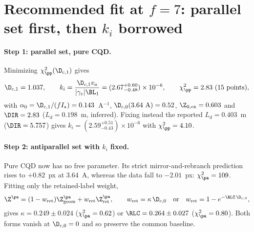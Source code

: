 \section{Recommended fit at \texorpdfstring{$f=7$}{f=7}: parallel set first, then \texorpdfstring{$k_i$}{ki} borrowed}
\label{sec:recommended}

\paragraph{Step 1: parallel set, pure CQD.} Minimizing $\chi^2_\pp(\D_{c,1})$ gives
\begin{equation}
\D_{c,1}=1.037,\qquad k_i=\frac{\D_{c,1}v_a}{|\gamma_e|\BL_1}=(2.67^{+0.60}_{-0.48})\times10^{-6},\qquad
\chi^2_\pp=2.83~(15~\text{points}),
\end{equation}
with $\alpha_0=\D_{c,1}/(fI_\star)=0.143$~A$^{-1}$, $\D_{c,0}(3.64~\text{A})=0.52$, $\Z_{0,\rm ex}=0.603$
and $\DIR=2.83$ ($L_d=0.198$~m, inferred). Fixing instead the reported $L_d=0.403$~m ($\DIR=5.757$)
gives $k_i=(2.59^{+0.51}_{-0.43})\times10^{-6}$ with $\chi^2_\pp=4.10$.

\paragraph{Step 2: antiparallel set with $k_i$ fixed.} Pure CQD now has no free parameter. Its strict
mirror-and-rebranch prediction rises to $+0.82$~px at 3.64~A, whereas the data fall to $-2.01$~px:
$\chi^2_\pa=109$. Fitting only the retained-label weight,
\begin{equation}
\Z^\pa=(1-w_{\rm ret})\Z^\pa_{\rm geom}+w_{\rm ret}\Z^\pa_{\rm ret},\qquad
w_{\rm ret}=\kappa\,\D_{c,0}\quad\text{or}\quad w_{\rm ret}=1-e^{-\RLC\,\D_{c,0}},
\end{equation}
gives $\kappa=0.249\pm0.024$ ($\chi^2_\pa=0.62$) or $\RLC=0.264\pm0.027$ ($\chi^2_\pa=0.80$). Both
forms vanish at $\D_{c,0}=0$ and so preserve the common baseline.

\begin{center}
\end{center}

